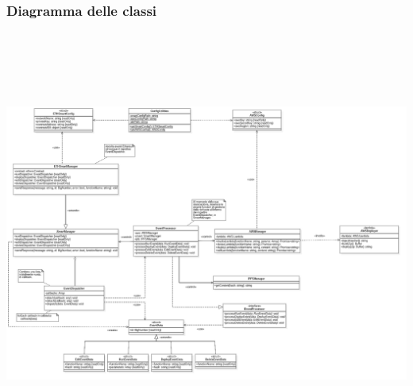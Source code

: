 \restoregeometry
{}
\begin{landscape}
\subsubsection{Diagramma delle classi}
	\includegraphics[width=23cm, height=14cm]{././diagrammi/etherless-server/Etherless-server-classi.png}
\end{landscape}
\restoregeometry

